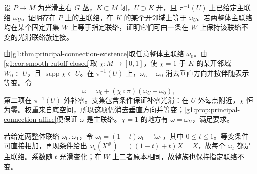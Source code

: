 \begin{exercise}\label{g1:ex:principal-connection-relative-extension}
	设 \(P\to M\) 为光滑主右 \(G\) 丛，\(K\subset M\) 闭，\(U\supset K\) 开，且 \(\pi^{-1}(U)\) 上已给定主联络 \(\omega_U\)。证明存在 \(P\) 上的主联络，在 \(K\) 的某个开邻域上等于 \(\omega_U\)。若两整体主联络均在某个固定开集 \(W\) 上等于指定联络，证明它们可由一条在 \(W\) 上保持该联络不变的光滑联络族连接。
\end{exercise}
\begin{solution}
	由\cref{g1:thm:principal-connection-existence}取任意整体主联络 \(\omega_0\)。由\cref{g1:cor:smooth-cutoff-closed}取 \(\chi:M\to[0,1]\)，使 \(\chi=1\) 于 \(K\) 的某开邻域 \(W_0\subset U\)，且 \(\operatorname{supp}\chi\subset U\)。在 \(\pi^{-1}(U)\) 上，\(\omega_U-\omega_0\) 消去垂直方向并按伴随表示等变。令
	\[
		\omega=\omega_0+(\chi\circ\pi)(\omega_U-\omega_0),
	\]
	第二项在 \(\pi^{-1}(U)\) 外补零。支集包含条件保证补零光滑：在 \(U\) 外每点附近，\(\chi\) 恒为零。权重来自底空间，所以这项仍消去垂直方向并等变；\cref{g1:prop:principal-connection-affine}便保证 \(\omega\) 是主联络。\(\chi=1\) 的地方有 \(\omega=\omega_U\)，满足要求。

	若给定两整体联络 \(\omega_0,\omega_1\)，令 \(\omega_t=(1-t)\omega_0+t\omega_1\)，其中 \(0\leq t\leq1\)。等变条件可直接相加，再现条件给出 \(\omega_t(X^\#)=((1-t)+t)X=X\)，故每个 \(\omega_t\) 都是主联络。系数随 \(t\) 光滑变化；在 \(W\) 上二者原本相同，故整族也保持指定联络不变。
\end{solution}

